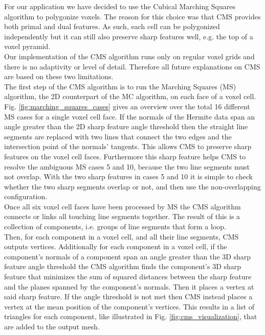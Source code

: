 For our application we have decided to use the Cubical Marching Squares algorithm \cite{cubical_marching_squares} to polygonize voxels. The reason for this choice was
that CMS provides both primal and dual features. As such, each cell can be polygonized independently but it can still also preserve sharp features well, e.g. the top of a voxel pyramid.\\
Our implementation of the CMS algorithm runs only on regular voxel grids and
there is no adaptivity or level of detail. Therefore all future explanations on CMS are based on these two limitations.\\
The first step of the CMS algorithm is to run the Marching Squares (MS) algorithm, the 2D counterpart of the MC algorithm, on each face of a voxel cell. Fig. \ref{fig:marching_squares_cases} gives an overview over the total 16 different MS cases for a single voxel cell face. If the normals of the Hermite data span an angle greater than the 2D sharp feature angle threshold then the straight line segments are replaced with two lines that connect the two edges and the intersection point of the normals' tangents. This allows CMS to preserve sharp features on the voxel cell faces. Furthermore this sharp feature helps CMS to resolve the ambiguous MS cases 5 and 10, because the two line segments must not overlap. With the two sharp features in cases 5 and 10 it is simple to check
whether the two sharp segments overlap or not, and then use the non-overlapping configuration.\\
Once all six voxel cell faces have been processed by MS the CMS algorithm connects or links all touching line segments together. The result of this is a collection of components, i.e. groups of line segments that form a loop.\\
Then, for each component in a voxel cell, and all their line segments, CMS outputs vertices. Additionally for each component in a voxel cell, if the component's normals of a component span an angle greater than the 3D sharp feature angle threshold the CMS algorithm finds the component's 3D sharp feature that minimizes the sum of squared distances between the sharp feature and the planes spanned by the component's normals. Then it places a vertex at said sharp feature. If the angle threshold is not met then CMS instead places a vertex at the mean position of the component's vertices. This results in a list of triangles for each component, like illustrated in Fig. \ref{fig:cms_visualization}, that are added to the output mesh.




